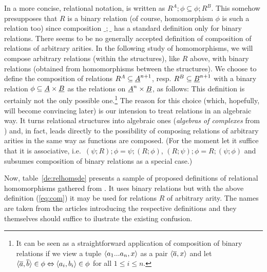 \documentclass[10pt]{article}
\begin{document}
In a more concise, relational notation,  is written as
$R^A;\phi\subseteq \phi;R^B$. This somehow presupposes that $R$ is a binary
relation (of course, homomorphism $\phi$ is such a relation too) since composition
$\_;\_$ has a standard definition only for binary relations.
 There seems to be no generally accepted
definition of composition of relations of arbitrary arities. In the following study
of homomorphisms, 
we will compose arbitrary relations (within the structures), like $R$ above, with
binary relations (obtained from homomorphisms between the structures). 
We choose to define the composition of relations
$R^A\subseteq \underline {A}^{n+1}$, resp.  $R^B\subseteq \underline {B}^{n+1}$
with a binary relation $\phi\subseteq \underline {A}\times\underline {B}$ as the
relations on $\underline {A}^n\times\underline {B}$, as follows:
%
This definition is certainly not the only possible one.\footnote{It
can be seen as a straightforward application of composition of binary
relations if we view a tuple $\langle a_1...a_n,x\rangle$ as a pair $\langle\overline {a},x\rangle$ and let $\langle\overline {a},\overline {b}\rangle\in\phi \Leftrightarrow \langle a_i,b_i\rangle\in\phi$ for
all $1\leq i\leq n$.}
The reason for this choice (which, hopefully, will become convincing
later) is our intension to treat relations in an algebraic way. It turns relational
structures into algebraic ones ({\em algebras of complexes} from \cite{JT1,JT2}) 
and, in
fact, leads directly to the possibility of composing relations of arbitrary arities 
in the same way as functions are composed. (For the moment let it suffice that it 
is associative,
i.e.\ $(\psi;R);\phi=\psi;(R;\phi)$, $(R;\psi);\phi=R;(\psi;\phi)$ and
 subsumes composition of binary relations as a special case.)

Now, table~\ref{de:relhomsde} presents
a sample of proposed definitions of relational homomorphisms gathered from 
\cite{Most,Gratzer,Cohn,Los:relhoms,Pattison,relhoms,c:93,c:94}. It uses binary
relations but with the above definition (\ref{eq:com}) it may be used for relations
$R$ of arbitrary arity.
The names are taken from the articles introducing the respective
definitions and they themselves should suffice to ilustrate the
existing confusion.  
\end{document}
